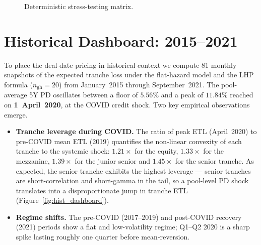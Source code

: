 \documentclass[11pt,a4paper]{article}
\newcommand{\1}{\mathbf{1}}
\begin{document}
\begin{figure}[H]
    \centering
    \caption{Deterministic stress-testing matrix.}
    \label{fig:stress}
\end{figure}

\section{Historical Dashboard: 2015--2021}\label{sec:dashboard}

To place the deal-date pricing in historical context we compute
81 monthly snapshots of the expected tranche loss under the
flat-hazard model and the LHP formula (\(n_{\text{gh}}=20\)) from
January~2015 through September~2021. The pool-average 5Y PD
oscillates between a floor of \(5.56\%\) and a peak of
\(\mathbf{11.84\%}\) reached on \textbf{1~April~2020}, at the COVID
credit shock. Two key empirical observations emerge.

\begin{itemize}[leftmargin=2em]
    \item \textbf{Tranche leverage during COVID.} The ratio of peak
          ETL (April~2020) to pre-COVID mean ETL (2019) quantifies
          the non-linear convexity of each tranche to the systemic
          shock: \(1.21\times\) for the equity, \(1.33\times\) for
          the mezzanine, \(1.39\times\) for the junior senior and
          \(\mathbf{1.45\times}\) for the senior tranche. As
          expected, the senior tranche exhibits the highest
          leverage --- senior tranches are short-correlation and
          short-gamma in the tail, so a pool-level PD shock
          translates into a disproportionate jump in tranche ETL
          (Figure~\ref{fig:hist_dashboard}).
    \item \textbf{Regime shifts.}
          The pre-COVID (2017--2019) and post-COVID recovery
          (2021) periods show a flat and low-volatility regime;
          Q1--Q2 2020 is a sharp spike lasting roughly one quarter
          before mean-reversion.
\end{itemize}
\end{document}
